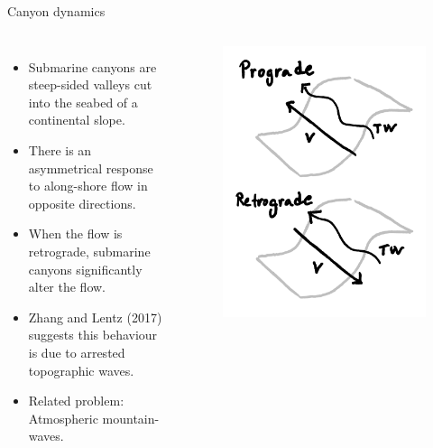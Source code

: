 \documentclass{beamer}
\begin{document}
\begin{frame}{Canyon dynamics}
\begin{columns}
\begin{itemize}
    \item Submarine canyons are steep-sided valleys cut into the seabed of a continental slope.
    \item There is an asymmetrical response to along-shore flow in opposite directions. 
    \item When the flow is retrograde, submarine canyons significantly alter the flow.
    \item Zhang and Lentz (2017) suggests this behaviour is due to arrested topographic waves.
    \item Related problem: Atmospheric mountain-waves. 
\end{itemize}
\begin{figure}
    \centering
    \includegraphics[width=\linewidth]{figures/prograde_retrograde_sketch.pdf}
\end{figure}
\end{columns}
\end{frame}
\end{document}

